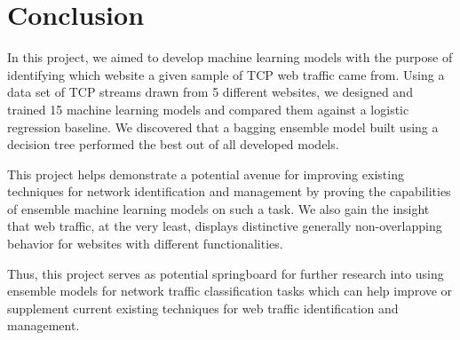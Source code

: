 \documentclass[10pt,sigconf,letterpaper,nonacm]{acmart}
\begin{document}
\section{Conclusion}

In this project, we aimed to develop machine learning models with the purpose of identifying which website a given sample of TCP web traffic came from.
Using a data set of TCP streams drawn from 5 different websites, we designed and trained 15 machine learning models and compared them against a logistic regression baseline.
We discovered that a bagging ensemble model built using a decision tree performed the best out of all developed models.

This project helps demonstrate a potential avenue for improving existing techniques for network identification and management by proving the capabilities of ensemble machine learning models on such a task.
We also gain the insight that web traffic, at the very least, displays distinctive generally non-overlapping behavior for websites with different functionalities.

Thus, this project serves as potential springboard for further research into using ensemble models for network traffic classification tasks which can help improve or supplement current existing techniques for web traffic identification and management.




\nocite{*}

\end{document}

